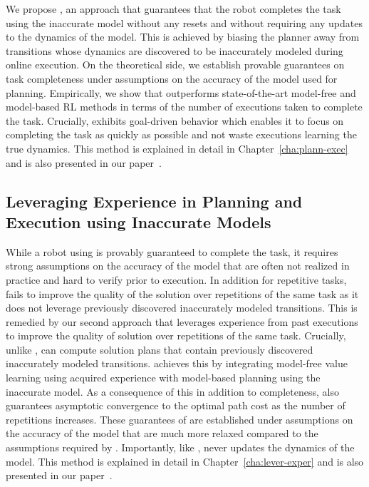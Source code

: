   We propose \cmax{}, an approach that guarantees that the robot
  completes the task using the inaccurate model without any resets and
  without requiring any updates to the dynamics of the model. This is
  achieved by biasing the planner away from transitions whose dynamics
  are discovered to be inaccurately modeled during online
  execution. On the theoretical side, we establish provable guarantees
  on task completeness under assumptions on the accuracy of the model
  used for planning. Empirically, we show that \cmax{} outperforms
  state-of-the-art model-free and model-based RL methods in terms of
  the number of executions taken to complete the task. Crucially,
  \cmax{} exhibits goal-driven behavior which enables it to focus on
  completing the task as quickly as possible and not waste executions  
  learning the true dynamics. This method is explained in detail in
  Chapter~\ref{cha:plann-exec} and is also presented in our
  paper~\cite{cmax}.

\subsection{Leveraging Experience in Planning and Execution using
  Inaccurate Models}
\label{sec:lever-exper-plann}
  
While a robot using \cmax{} is provably guaranteed to complete
  the task, it requires strong assumptions on the accuracy of the
  model that are often not realized in practice and hard to verify
  prior to execution. In addition for repetitive tasks, \cmax{} fails
  to improve the quality of the solution over repetitions of the same
  task as it does not leverage previously discovered inaccurately
  modeled transitions. This is remedied by our second approach
  \cmaxpp{} that leverages experience from past executions to improve
  the quality of solution over repetitions of the same
  task. Crucially, unlike \cmax{}, \cmaxpp{} can compute solution
  plans that contain previously discovered inaccurately modeled
  transitions. \cmaxpp{} achieves this by integrating model-free value
  learning using acquired experience with model-based planning using
  the inaccurate model. As a consequence of this in addition to
  completeness, \cmaxpp{} also guarantees asymptotic convergence to
  the optimal path cost as the number of repetitions increases. These
  guarantees of \cmaxpp{} are established under assumptions on the
  accuracy of the model that are much more relaxed compared to the
  assumptions required by \cmax{}. Importantly, like \cmax{},
  \cmaxpp{} never updates the dynamics of the model. This method is
  explained in detail in Chapter~\ref{cha:lever-exper} and is also 
  presented in our paper~\cite{cmaxpp}.

